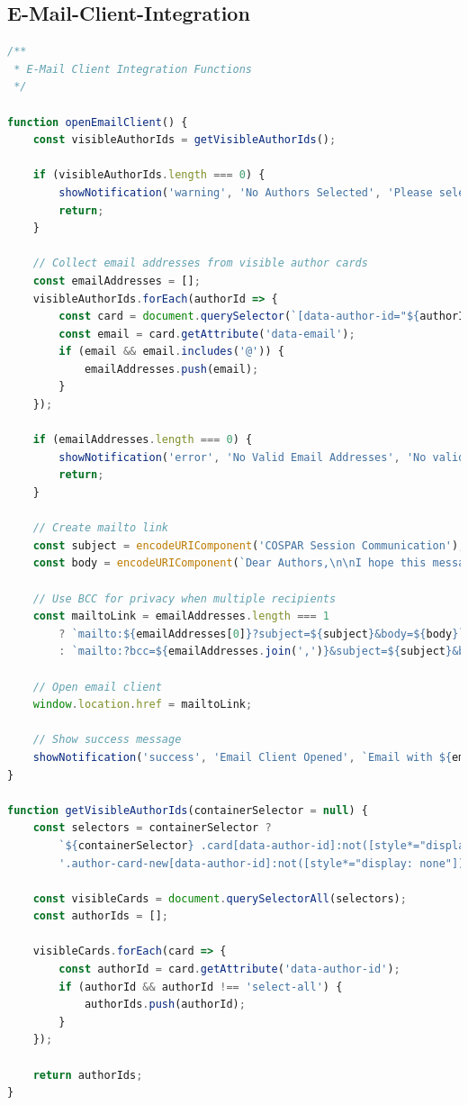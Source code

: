 \documentclass[11pt,a4paper]{article}
\begin{document}
\subsection{E-Mail-Client-Integration}
\begin{lstlisting}[language=JavaScript, caption=Externe E-Mail-Client-Integration]
/**
 * E-Mail Client Integration Functions
 */

function openEmailClient() {
    const visibleAuthorIds = getVisibleAuthorIds();
    
    if (visibleAuthorIds.length === 0) {
        showNotification('warning', 'No Authors Selected', 'Please select at least one author to send email to.');
        return;
    }
    
    // Collect email addresses from visible author cards
    const emailAddresses = [];
    visibleAuthorIds.forEach(authorId => {
        const card = document.querySelector(`[data-author-id="${authorId}"]`);
        const email = card.getAttribute('data-email');
        if (email && email.includes('@')) {
            emailAddresses.push(email);
        }
    });
    
    if (emailAddresses.length === 0) {
        showNotification('error', 'No Valid Email Addresses', 'No valid email addresses found for selected authors.');
        return;
    }
    
    // Create mailto link
    const subject = encodeURIComponent('COSPAR Session Communication');
    const body = encodeURIComponent(`Dear Authors,\n\nI hope this message finds you well.\n\n[Your message here]\n\nBest regards,\n${getUserNameForJS()}`);
    
    // Use BCC for privacy when multiple recipients
    const mailtoLink = emailAddresses.length === 1 
        ? `mailto:${emailAddresses[0]}?subject=${subject}&body=${body}`
        : `mailto:?bcc=${emailAddresses.join(',')}&subject=${subject}&body=${body}`;
    
    // Open email client
    window.location.href = mailtoLink;
    
    // Show success message
    showNotification('success', 'Email Client Opened', `Email with ${emailAddresses.length} recipient(s) ready to send.`);
}

function getVisibleAuthorIds(containerSelector = null) {
    const selectors = containerSelector ? 
        `${containerSelector} .card[data-author-id]:not([style*="display: none"])` :
        '.author-card-new[data-author-id]:not([style*="display: none"]), #authorCards .card[data-author-id]:not([style*="display: none"])';
    
    const visibleCards = document.querySelectorAll(selectors);
    const authorIds = [];

    visibleCards.forEach(card => {
        const authorId = card.getAttribute('data-author-id');
        if (authorId && authorId !== 'select-all') {
            authorIds.push(authorId);
        }
    });
    
    return authorIds;
}
\end{lstlisting}
\end{document}
